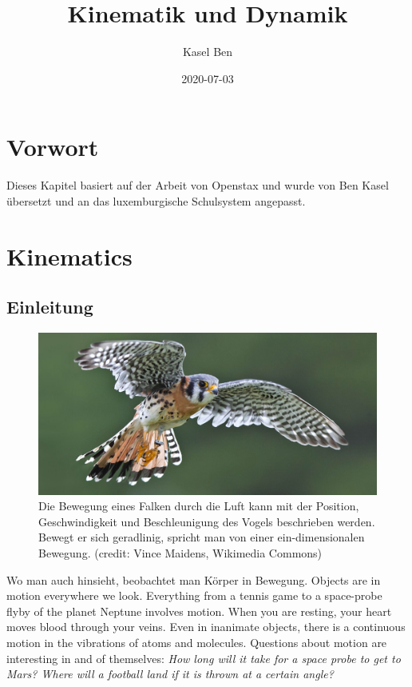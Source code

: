 \documentclass[
]{book}
\title{Kinematik und Dynamik}
\author{Kasel Ben}
\date{2020-07-03}
\begin{document}
\maketitle

{
\setcounter{tocdepth}{1}
\tableofcontents
}
\hypertarget{vorwort}{%
\chapter{Vorwort}\label{vorwort}}

Dieses Kapitel basiert auf der Arbeit von Openstax \citet{wolfe_college_2015} und wurde von Ben Kasel übersetzt und an das luxemburgische Schulsystem angepasst.

\hypertarget{kinematics}{%
\chapter{Kinematics}\label{kinematics}}

\hypertarget{einleitung}{%
\section{Einleitung}\label{einleitung}}

\begin{figure}
\hypertarget{import-auto-id2758213}{%
\centering
\includegraphics{images/Figure_02_00_01_D.jpg}
\caption{Die Bewegung eines Falken durch die Luft kann mit der Position, Geschwindigkeit und Beschleunigung des Vogels beschrieben werden. Bewegt er sich geradlinig, spricht man von einer ein-dimensionalen Bewegung. (credit: Vince Maidens, Wikimedia
Commons)}\label{import-auto-id2758213}
}
\end{figure}

Wo man auch hinsieht, beobachtet man Körper in Bewegung.
Objects are in motion everywhere we look. Everything from a tennis game
to a space-probe flyby of the planet Neptune involves motion. When you
are resting, your heart moves blood through your veins. Even in
inanimate objects, there is a continuous motion in the vibrations of
atoms and molecules. Questions about motion are interesting in and of
themselves: \emph{How long will it take for a space probe to get to Mars?
Where will a football land if it is thrown at a certain angle?}
\end{document}

